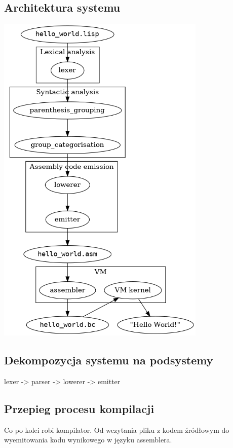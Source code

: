 \documentclass[11pt,oneside,a4paper,titlepage,onecolumn]{article}
\begin{document}
\subsection{Architektura systemu}
\label{architektura_systemu}

\includegraphics[width=10cm]{viuact-pipeline}

\subsection{Dekompozycja systemu na podsystemy}
\label{architektura_kompilatora_viuact}

lexer -> parser -> lowerer -> emitter

\subsection{Przepieg procesu kompilacji}
\label{opis_etapow_kompilacji}

Co po kolei robi kompilator.
Od wczytania pliku z kodem źródłowym do wyemitowania kodu wynikowego w języku assemblera.
\end{document}
